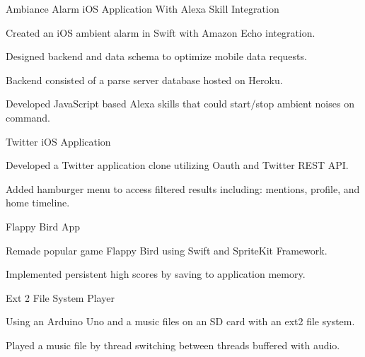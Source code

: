 


\begin{cventriesproj}

\cventryproj
{Ambiance Alarm iOS Application With Alexa Skill Integration} %
{
\begin{cvitems}
\item {Created an iOS ambient alarm in Swift with Amazon Echo integration.}
\item {Designed backend and data schema to optimize mobile data requests.}
\item {Backend consisted of a parse server database hosted on Heroku.}
\item {Developed JavaScript based Alexa skills that could start/stop ambient noises on command.}
\end{cvitems}
}


\cventryproj
{Twitter iOS Application} %
{
\begin{cvitems}
\item {Developed a Twitter application clone utilizing Oauth and Twitter REST API.}
\item {Added hamburger menu to access filtered results including: mentions, profile, and home timeline.}
\end{cvitems}
}

\cventryproj
{Flappy Bird App} %
{
\begin{cvitems}
\item {Remade popular game Flappy Bird using Swift and SpriteKit Framework.}
\item {Implemented persistent high scores by saving to application memory.}
\end{cvitems}
}



\cventryproj
{Ext 2 File System Player} %
{
\begin{cvitems}
\item {Using an Arduino Uno and a music files on an SD card with an ext2 file system.}
\item {Played a music file by thread switching between threads buffered with audio.}
\end{cvitems}
}


\end{cventriesproj}
